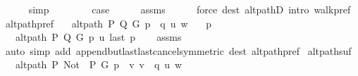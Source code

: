 \begin{isabellebody}
\ \ \ \ \isamarkupfalse%
\ simp\isanewline
{}\isamarkupfalse%
\isanewline
\ \ \isamarkupfalse%
\ {}\isanewline
\ \ \isamarkupfalse%
\ {\isacharquery}{\kern0pt}case\isanewline
\ \ \ \ \isamarkupfalse%
\ assms\isanewline
\ \ \ \ \isamarkupfalse%
\ {\isacharparenleft}{\kern0pt}force\ dest{\isacharcolon}{\kern0pt}\ alt{\isacharunderscore}{\kern0pt}pathD{\isacharparenleft}{\kern0pt}{}{\isacharparenright}{\kern0pt}\ intro{\isacharcolon}{\kern0pt}\ walk{\isacharunderscore}{\kern0pt}pref{\isacharparenright}{\kern0pt}\isanewline
{}\isamarkupfalse%
%
\endisatagproof
{\isafoldproof}%
%
\isadelimproof
\isanewline
%
\endisadelimproof
\isanewline
{}\isamarkupfalse%
\ alt{\isacharunderscore}{\kern0pt}path{\isacharunderscore}{\kern0pt}pref{\isacharunderscore}{\kern0pt}{}{\isacharcolon}{\kern0pt}\isanewline
\ \ \ {\isachardoublequoteopen}alt{\isacharunderscore}{\kern0pt}path\ P\ Q\ G\ {\isacharparenleft}{\kern0pt}p\ {\isacharat}{\kern0pt}\ q{\isacharparenright}{\kern0pt}\ u\ w{\isachardoublequoteclose}\isanewline
\ \ \ {\isachardoublequoteopen}p\ {\isasymnoteq}\ {\isacharbrackleft}{\kern0pt}{\isacharbrackright}{\kern0pt}{\isachardoublequoteclose}\isanewline
\ \ \ {\isachardoublequoteopen}alt{\isacharunderscore}{\kern0pt}path\ P\ Q\ G\ p\ u\ {\isacharparenleft}{\kern0pt}last\ p{\isacharparenright}{\kern0pt}{\isachardoublequoteclose}\isanewline
%
\isadelimproof
\ \ %
\endisadelimproof
%
\isatagproof
{}\isamarkupfalse%
\ assms\isanewline
\ \ \isamarkupfalse%
\ {\isacharparenleft}{\kern0pt}auto\ simp\ add{\isacharcolon}{\kern0pt}\ append{\isacharunderscore}{\kern0pt}butlast{\isacharunderscore}{\kern0pt}last{\isacharunderscore}{\kern0pt}cancel{\isacharbrackleft}{\kern0pt}symmetric{\isacharbrackright}{\kern0pt}\ dest{\isacharcolon}{\kern0pt}\ alt{\isacharunderscore}{\kern0pt}path{\isacharunderscore}{\kern0pt}pref{\isacharparenright}{\kern0pt}%
\endisatagproof
{\isafoldproof}%
%
\isadelimproof
\isanewline
%
\endisadelimproof
\isanewline
{}\isamarkupfalse%
\ alt{\isacharunderscore}{\kern0pt}path{\isacharunderscore}{\kern0pt}suf{\isacharcolon}{\kern0pt}\isanewline
\ \ \ {\isachardoublequoteopen}alt{\isacharunderscore}{\kern0pt}path\ P\ {\isacharparenleft}{\kern0pt}Not\ {\isasymcirc}\ P{\isacharparenright}{\kern0pt}\ G\ {\isacharparenleft}{\kern0pt}p\ {\isacharat}{\kern0pt}\ {\isacharbrackleft}{\kern0pt}v{\isacharcomma}{\kern0pt}\ v{\isacharprime}{\kern0pt}{\isacharbrackright}{\kern0pt}\ {\isacharat}{\kern0pt}\ q{\isacharparenright}{\kern0pt}\ u\ w{\isachardoublequoteclose}\isanewline

\end{isabellebody}
